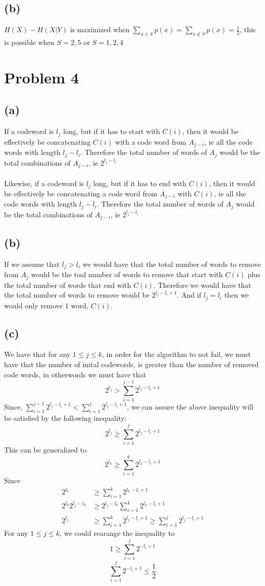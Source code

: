 \subsection*{(b)}
$H(X)-H(X|Y)$ is maximized when 
$\sum_{x\in S}p(x)=\sum_{x\notin S}p(x)=\frac{1}{2}$, this is possible
when $S=\boxed{2,5}$ or $S=\boxed{1,2,4}$
\section*{Problem 4}
\subsection*{(a)}
If a codeword is $l_j$ long, but if it has to start with $C(i)$, then it would be effectively be
concatenating $C(i)$ with a code word from $A_{j-i}$, ie all the code words with length $l_j-l_i$. Therefore the total number of words 
of $A_j$ would be the total combinations of $A_{j-i}$, ie $2^{l_j-l_i}$\\\\
Likewise, if a codeword is $l_j$ long, but if it has to end with $C(i)$, then it would be effectively be
concatenating a code word from $A_{j-i}$ with $C(i)$, ie all the code words with length $l_j-l_i$. Therefore the total number of words 
of $A_j$ would be the total combinations of $A_{j-i}$, ie $2^{l_j-l_i}$
\subsection*{(b)}
If we assume that $l_j>l_i$ we would have that the total number of words to remove from $A_j$ would
be the toal number of words to remove that start with $C(i)$ plus the total number of words that end with
$C(i)$. Therefore we would have that the total number of words to remove would be $2^{l_j-l_i+1}$. 
And if $l_j=l_i$ then we would only remove $1$ word, $C(i)$.
\subsection*{(c)}
We have that for any $1\leq j\leq k$, in order for the algorithm to not fail, we must
have that the number of inital codewords, is greater than the number
of removed code words, in otherwords we must have that
$$2^{l_j}>\sum_{i=1}^{j-1}2^{l_j-l_i+1}$$
Since, $\sum_{i=1}^{j-1}2^{l_j-l_i+1}<\sum_{i=1}^{j}2^{l_j-l_i+1}$, we can
assure the above inequality will be satisfied by the following inequality:
$$2^{l_j}\geq\sum_{i=1}^j2^{l_j-l_i+1}$$
This can be generalized to 
$$2^{l_k}\geq\sum_{i=1}^k2^{l_k-l_i+1}$$
Since
\begin{align*}
	2^{l_k}&\geq\sum_{i=1}^k2^{l_k-l_i+1}\\
	2^{l_k}2^{l_j-l_k}&\geq2^{l_j-l_k}\sum_{i=1}^k2^{l_k-l_i+1}\\
	2^{l_j}&\geq\sum_{i=1}^k2^{l_j-l_i+1}\geq \sum_{i=1}^j2^{l_j-l_i+1}
\end{align*}
For any $1\leq j\leq k$, we could rearange the inequality to 
$$1\geq\sum_{i=1}^j2^{-l_i+1}$$
$$\sum_{i=1}^j2^{-l_i+1}\leq\frac{1}{2}$$

